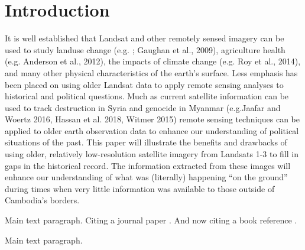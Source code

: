 \section{Introduction}
It is well established that Landsat and other remotely sensed imagery can be used to study landuse change (e.g. \cite{Seto et al., 2002}; Gaughan et al., 2009), agriculture health (e.g. Anderson et al., 2012), the impacts of climate change (e.g. Roy et al., 2014), and many other physical characteristics of the earth's surface.  
Less emphasis has been placed on using older Landsat data to apply remote sensing analyses to historical and political questions. Much as current satellite information can be used to track destruction in Syria and genocide in Myanmar (e.g.Jaafar and Woertz 2016, Hassan et al. 2018, Witmer 2015) remote sensing techniques can be applied to older earth observation data to enhance our understanding of political situations of the past.  This paper will illustrate the benefits and drawbacks of using older, relatively low-resolution satellite imagery from Landsats 1-3 to fill in gaps in the historical record.
The information extracted from these images will enhance our understanding of what was (literally) happening “on the ground” during times when very little information was available to those outside of Cambodia’s borders.


Main text paragraph. Citing a journal paper \cite{ref-journal}. And now citing a book reference \cite{ref-book}.


Main text paragraph.
